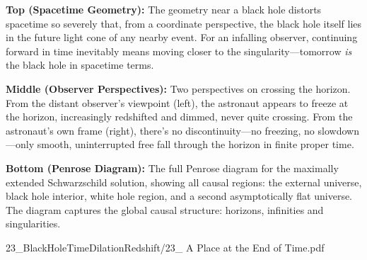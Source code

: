 \begin{SideNotePage}{
  \textbf{Top (Spacetime Geometry):} The geometry near a black hole distorts spacetime so severely that, from a coordinate perspective, the black hole itself lies in the future light cone of any nearby event. For an infalling observer, continuing forward in time inevitably means moving closer to the singularity—tomorrow \textit{is} the black hole in spacetime terms. \par
  \textbf{Middle (Observer Perspectives):} Two perspectives on crossing the horizon. From the distant observer’s viewpoint (left), the astronaut appears to freeze at the horizon, increasingly redshifted and dimmed, never quite crossing. From the astronaut’s own frame (right), there’s no discontinuity—no freezing, no slowdown—only smooth, uninterrupted free fall through the horizon in finite proper time. \par
  \textbf{Bottom (Penrose Diagram):} The full Penrose diagram for the maximally extended Schwarzschild solution, showing all causal regions: the external universe, black hole interior, white hole region, and a second asymptotically flat universe. The diagram captures the global causal structure: horizons, infinities and singularities. \par
}{23_BlackHoleTimeDilationRedshift/23_ A Place at the End of Time.pdf}
\end{SideNotePage}
